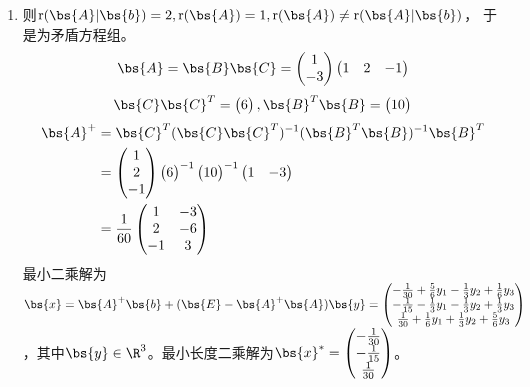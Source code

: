 \documentclass[12pt, a4paper, oneside, UTF8]{ctexbook}
\begin{document}
\begin{solution}
\begin{enumerate}[label=(\arabic*)]
        \item  则$\mathrm{r}(\bs{A}|\bs{b})=2,\mathrm{r}(\bs{A})=1,\mathrm{r}(\bs{A}) \neq \mathrm{r}(\bs{A}|\bs{b})$，
        于是为矛盾方程组。
        \begin{align*}
            \bs{A}=\bs{B}\bs{C}=\begin{pmatrix}
                1\\
                -3
            \end{pmatrix}\begin{pmatrix}
                1&2&-1
            \end{pmatrix}
        \end{align*}
        \begin{align*}
            \bs{C}\bs{C}^T=\begin{pmatrix}
                6
            \end{pmatrix},\bs{B}^T\bs{B}=\begin{pmatrix}
                10
            \end{pmatrix}
        \end{align*}
        \begin{align*}
            \bs{A}^+&=\bs{C}^T(\bs{C}\bs{C}^T)^{-1}(\bs{B}^T\bs{B})^{-1}\bs{B}^T\\
            &=\begin{pmatrix}
                1\\
                2\\
                -1
            \end{pmatrix}\begin{pmatrix}
                6
            \end{pmatrix}^{-1}\begin{pmatrix}
                10
            \end{pmatrix}^{-1}\begin{pmatrix}
                1&-3
            \end{pmatrix}\\
            &=\frac{1}{60}\begin{pmatrix}
                1&-3\\
                2&-6\\
                -1&3
            \end{pmatrix}
        \end{align*}
        最小二乘解为$\bs{x}=\bs{A}^+\bs{b}+(\bs{E}-\bs{A}^+\bs{A})\bs{y}
        =\begin{pmatrix}
            -\frac{1}{30}+\frac{5}{6}y_1-\frac{1}{3}y_2+\frac{1}{6}y_3\\
            -\frac{1}{15}-\frac{1}{3}y_1-\frac{1}{3}y_2+\frac{1}{3}y_3\\
            \frac{1}{30}+\frac{1}{6}y_1+\frac{1}{3}y_2+\frac{5}{6}y_3
        \end{pmatrix}$，其中$\bs{y}\in \R^3$。最小长度二乘解为$\bs{x}^{*}=\begin{pmatrix}
            -\frac{1}{30}\\
            -\frac{1}{15}\\
            \frac{1}{30}
        \end{pmatrix}$。


\end{enumerate}
\end{solution}
\end{document}

